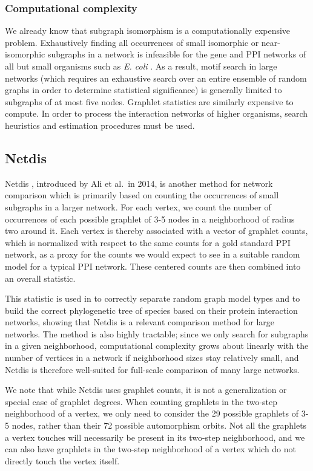 \documentclass[12pt]{thesis}
\theoremstyle{plain}
\theoremstyle{definition}
\theoremstyle{remark}
\begin{document}
\subsubsection{Computational complexity}

We already know that subgraph isomorphism is a computationally expensive problem. Exhaustively finding all occurrences of small isomorphic or near-isomorphic subgraphs in a network is infeasible for the gene and PPI networks of all but small organisms such as \textit{E. coli} \cite{Emmert_Streib_2016}. As a result, motif search in large networks (which requires an exhaustive search over an entire ensemble of random graphs in order to determine statistical significance) is generally limited to subgraphs of at most five nodes. Graphlet statistics are similarly expensive to compute. In order to process the interaction networks of higher organisms, search heuristics and estimation procedures must be used.

\subsection{Netdis}

Netdis \cite{Ali_2014}, introduced by Ali et al.\ in 2014, is another method for network comparison which is primarily based on counting the occurrences of small subgraphs in a larger network. For each vertex, we count the number of occurrences of each possible graphlet of 3-5 nodes in a neighborhood of radius two around it. Each vertex is thereby associated with a vector of graphlet counts, which is normalized with respect to the same counts for a gold standard PPI network, as a proxy for the counts we would expect to see in a suitable random model for a typical PPI network. These centered counts are then combined into an overall statistic. 

This statistic is used in \cite{Ali_2014} to correctly separate random graph model types and to build the correct phylogenetic tree of species based on their protein interaction networks, showing that Netdis is a relevant comparison method for large networks. The method is also highly tractable; since we only search for subgraphs in a given neighborhood, computational complexity grows about linearly with the number of vertices in a network if neighborhood sizes stay relatively small, and Netdis is therefore well-suited for full-scale comparison of many large networks.

We note that while Netdis uses graphlet counts, it is not a generalization or special case of graphlet degrees. When counting graphlets in the two-step neighborhood of a vertex, we only need to consider the 29 possible graphlets of 3-5 nodes, rather than their 72 possible automorphism orbits.
Not all the graphlets a vertex touches will necessarily be present in its two-step neighborhood, and we can also have graphlets in the two-step neighborhood of a vertex which do not directly touch the vertex itself. 
\end{document}
